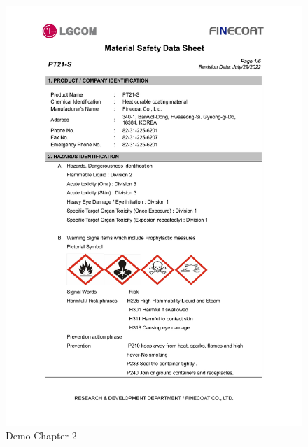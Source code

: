\documentclass[a4paper,12pt,twoside]{report}
\begin{document}
\begin{figure}[H]
		\includegraphics[width=\textwidth, keepaspectratio]{images/chaps1}
	\caption[Demo Chapter 2 ]{Demo Chapter 2}
\label{chaps1}
\end{figure}
\end{document}
